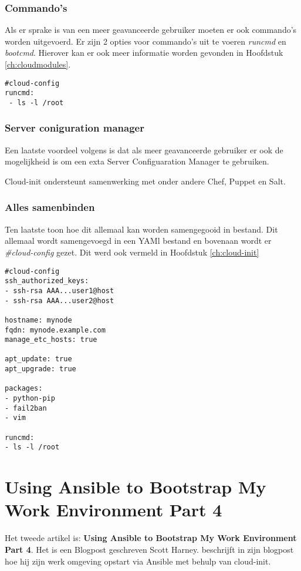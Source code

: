 \subsubsection{Commando's}
Als er sprake is van een meer geavanceerde gebruiker moeten er ook commando's worden uitgevoerd. Er zijn 2 opties voor commando's uit te voeren \textit{runcmd} en \textit{bootcmd}. Hierover kan er ook meer informatie worden gevonden in Hoofdstuk \ref*{ch:cloudmodules}.
\begin{lstlisting}
#cloud-config
runcmd:
 - ls -l /root
\end{lstlisting} 
\subsubsection{Server coniguration manager}
Een laatste voordeel volgens \autocite{viktorpet} is dat als meer geavanceerde gebruiker er ook de mogelijkheid is om een exta Server Configuaration Manager te gebruiken. 

Cloud-init ondersteunt samenwerking met onder andere Chef, Puppet en Salt.
\subsubsection{Alles samenbinden}
Ten laatste toon \autocite{viktorpet} hoe dit allemaal kan worden samengegooid in bestand. Dit allemaal wordt samengevoegd in een YAMl bestand en bovenaan wordt er \textit{\#cloud-config} gezet. Dit werd ook vermeld in Hoofdstuk \ref*{ch:cloud-init}
\begin{lstlisting}
#cloud-config
ssh_authorized_keys:
- ssh-rsa AAA...user1@host
- ssh-rsa AAA...user2@host

hostname: mynode
fqdn: mynode.example.com
manage_etc_hosts: true

apt_update: true
apt_upgrade: true

packages:
- python-pip
- fail2ban
- vim

runcmd:
- ls -l /root
\end{lstlisting} 

\section{Using Ansible to Bootstrap My Work Environment Part 4}
Het tweede artikel is: \textbf{Using Ansible to Bootstrap My Work Environment Part 4}. Het is een Blogpost geschreven Scott Harney. \autocite{scottharney} beschrijft in zijn blogpost hoe hij zijn werk omgeving opstart via Ansible met behulp van cloud-init. 

